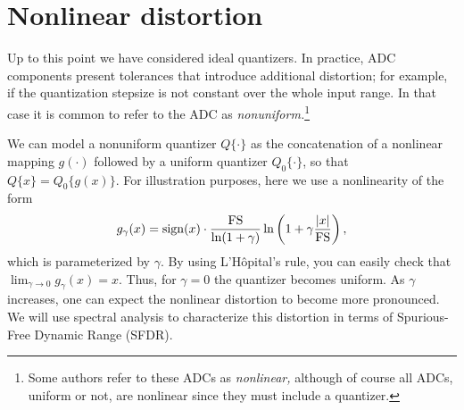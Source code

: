 \documentclass[11pt]{article}
\newcommand{\sign}{\mathop{\rm sign}}
\begin{document}
\section{Nonlinear distortion}

Up to this point we have considered ideal quantizers. In practice, ADC components present tolerances that introduce additional distortion; for example, if the quantization stepsize is not constant over the whole input range. In that case it is common to refer to the ADC as {\em nonuniform.}\footnote{Some authors refer to these ADCs as {\it nonlinear,} although of course all ADCs, uniform or not, are nonlinear since they must include a quantizer.}

We can model a nonuniform quantizer $Q\{\cdot\}$ as the concatenation of a nonlinear 
mapping $g(\cdot)$ followed by a uniform quantizer $Q_0\{\cdot\}$, so that $Q\{x\} =Q_0\{g(x)\}$. 
For illustration purposes, here we use a nonlinearity of the form
\begin{equation}\label{eq:mulaw}
g_\gamma(x) = \sign(x) \cdot \frac{\rm FS}{\ln(1+\gamma)} \ln\left(1+\gamma\frac{|x|}{\rm FS}\right),
\end{equation}
which is parameterized by $\gamma$. By using L'H\^opital's rule, you can easily check that $\lim_{\gamma\rightarrow 0} g_\gamma(x) = x$. Thus, for $\gamma=0$ the quantizer becomes uniform. As $\gamma$ increases, one can expect the nonlinear distortion to become more pronounced. We will use spectral analysis to characterize this distortion in terms of Spurious-Free Dynamic Range (SFDR).
\end{document}
